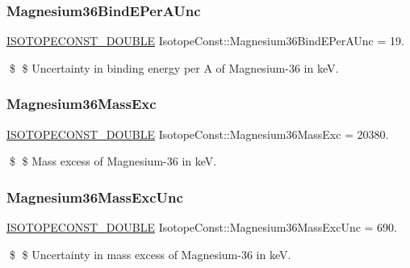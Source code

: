 \subsubsection{\texorpdfstring{Magnesium36\+Bind\+E\+Per\+A\+Unc}{Magnesium36BindEPerAUnc}}
{\footnotesize\ttfamily \mbox{\hyperlink{group___isotope_const-_macros_ga8f45a7272ce02c0b4c65c44636ed719a}{I\+S\+O\+T\+O\+P\+E\+C\+O\+N\+S\+T\+\_\+\+D\+O\+U\+B\+LE}} Isotope\+Const\+::\+Magnesium36\+Bind\+E\+Per\+A\+Unc = 19.}

\$ \$ Uncertainty in binding energy per A of Magnesium-\/36 in keV. \mbox{\label{group___isotope_const-_magnesium-_mg36_gad162ae600b59fcf96bdad197e26ef8be}} 
\subsubsection{\texorpdfstring{Magnesium36\+Mass\+Exc}{Magnesium36MassExc}}
{\footnotesize\ttfamily \mbox{\hyperlink{group___isotope_const-_macros_ga8f45a7272ce02c0b4c65c44636ed719a}{I\+S\+O\+T\+O\+P\+E\+C\+O\+N\+S\+T\+\_\+\+D\+O\+U\+B\+LE}} Isotope\+Const\+::\+Magnesium36\+Mass\+Exc = 20380.}

\$ \$ Mass excess of Magnesium-\/36 in keV. \mbox{\label{group___isotope_const-_magnesium-_mg36_gacb3f1f53c9be0431b60a2e8908f3a7bd}} 
\subsubsection{\texorpdfstring{Magnesium36\+Mass\+Exc\+Unc}{Magnesium36MassExcUnc}}
{\footnotesize\ttfamily \mbox{\hyperlink{group___isotope_const-_macros_ga8f45a7272ce02c0b4c65c44636ed719a}{I\+S\+O\+T\+O\+P\+E\+C\+O\+N\+S\+T\+\_\+\+D\+O\+U\+B\+LE}} Isotope\+Const\+::\+Magnesium36\+Mass\+Exc\+Unc = 690.}

\$ \$ Uncertainty in mass excess of Magnesium-\/36 in keV. \mbox{\label{group___isotope_const-_magnesium-_mg36_ga2f10069bf1936d0d323cd4be5c1cefe2}} 
